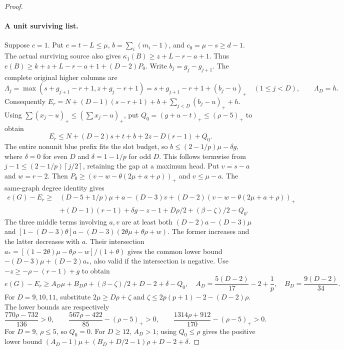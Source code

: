 \documentclass[11pt,a4paper]{article}
\newcommand{\ceil}[1]{\left\lceil#1\right\rceil}
\theoremstyle{definition}
\begin{document}
\begin{proof}
\paragraph{A unit surviving list.}
Suppose $c=1$. Put $e=t-L\le\mu$, $b=\sum_i(m_i-1)$, and $c_0=\mu-s\ge d-1$.
The actual surviving source also gives
$\kappa_1(B)\ge z+L-r-a+1$.
Thus
$e(B)\ge k+z+L-r-a+1+(D-2)P_0$.
Write $b_j=g_j-g_{j+1}$. The complete original higher columns are
\begin{equation}\label{eq:binary-empty-profile}
 \Lambda_j=\max(s+g_{j+1}-r+1,z+g_j-r+1)
 =s+g_{j+1}-r+1+(b_j-u)_+\quad(1\le j<D),
 \qquad\Lambda_D=h.
\end{equation}
Consequently
$E_r=N+(D-1)(s-r+1)+b+\sum_{j<D}(b_j-u)_++h$.
Using $\sum(x_j-u)_+\le(\sum x_j-u)_+$, put
$Q_0=(g+u-t)_+\le(\rho-5)_+$ to obtain
\[
 E_r\le N+(D-2)s+t+b+2z-D(r-1)+Q_0.
\]
The entire nonunit blue prefix fits the slot budget, so
$b\le(2-1/p)\mu-\delta g$, where $\delta=0$ for even $D$ and $\delta=1-1/p$ for odd $D$.
This follows termwise from $j-1\le(2-1/p)\ceil{j/2}$, retaining the gap at a maximum head.
Put $v=s-a$ and $w=r-2$.
Then $P_0\ge(v-w-\theta(2\mu+a+\rho))_+$ and $v\le\mu-a$.
The same-graph degree identity gives
\[
\begin{aligned}
 e(G)-E_r\ge{}&(D-5+1/p)\mu+
 a-(D-3)v+(D-2)(v-w-\theta(2\mu+a+\rho))_+\\
 &+(D-1)(r-1)+\delta g-z-1
 +D\rho/2+(\beta-\zeta)/2-Q_0.
\end{aligned}
\]
The three middle terms involving $a,v$ are at least both
$(D-2)a-(D-3)\mu$ and
$[1-(D-3)\theta]a-(D-3)(2\theta\mu+\theta\rho+w)$.
The former increases and the latter decreases with $a$.
Their intersection
$a_*=[(1-2\theta)\mu-\theta\rho-w]/(1+\theta)$
gives the common lower bound $-(D-3)\mu+(D-2)a_*$, also valid if the intersection is negative.
Use $-z\ge-\rho-(r-1)+g$ to obtain
\begin{equation}\label{eq:binary-unit-pay}
 e(G)-E_r\ge A_D\mu+B_D\rho+(\beta-\zeta)/2+D-2+\delta-Q_0,
 \quad
 A_D=\frac{5(D-2)}{17}-2+\frac1p,\quad
 B_D=\frac{9(D-2)}{34}.
\end{equation}
For $D=9,10,11$, substitute
$2\mu\ge D\rho+\zeta$ and
$\zeta\le2p(p+1)-2-(D-2)\rho$.
The lower bounds are respectively
\[
 \frac{770\rho-732}{136}>0,\qquad
 \frac{567\rho-422}{85}-(\rho-5)_+>0,\qquad
 \frac{1314\rho+912}{170}-(\rho-5)_+>0.
\]
For $D=9$, $\rho\le5$, so $Q_0=0$.
For $D\ge12$, $A_D>1$; using $Q_0\le\rho$ gives the positive lower bound
$(A_D-1)\mu+(B_D+D/2-1)\rho+D-2+\delta$.


\end{proof}
\end{document}
